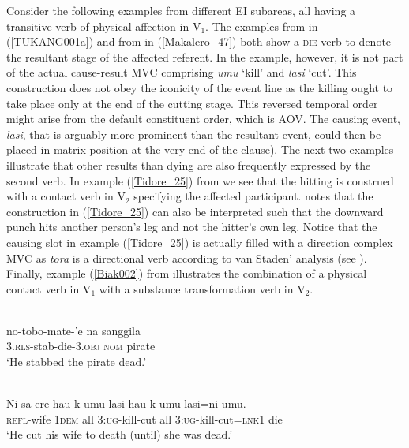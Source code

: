 Consider the following examples from different EI subareas, all having a transitive verb of physical affection in V$_1$. The examples from  in (\ref{TUKANG001a}) and from  in (\ref{Makalero_47}) both show a \textsc{die} verb to denote the resultant stage of the affected referent. In the  example, however, it is not part of the actual cause-result MVC comprising \textit{umu} `kill' and \textit{lasi} `cut'. This construction does not obey the iconicity of the event line as the killing ought to take place only at the end of the cutting stage. This reversed temporal order might arise from the default  constituent order, which is AOV. The causing event, \textit{lasi}, that is arguably more prominent than the resultant event, could then be placed in matrix position at the very end of the clause). The next two examples illustrate that other results than dying are also frequently expressed by the second verb. In example (\ref{Tidore_25}) from  we see that the hitting is construed with a contact verb in V$_2$ specifying the affected participant. \citet[126]{vanstaden2000tidore} notes that the construction in (\ref{Tidore_25}) can also be interpreted such that the downward punch hits another person's leg and not the hitter's own leg. Notice that the causing slot in example (\ref{Tidore_25}) is actually filled with a direction complex MVC as \textit{tora} is a directional verb according to van Staden' analysis (see \citealt[110]{vanstaden2000tidore}).  Finally, example (\ref{Biak002}) from  illustrates the combination of a physical contact verb in V$_1$ with a substance transformation verb in V$_2$.

\ea \label{TUKANG001a}
\\
\gll no-tobo-mate-'e na sanggila \\
\textsc{3}.\textsc{rls}-stab-die-\textsc{3}.\textsc{obj} \textsc{nom} pirate \\
\glft `He stabbed the pirate dead.'\\ 
\z

\ea \label{Makalero_47}
\\
\gll Ni-sa ere hau k-umu-lasi hau k-umu-lasi=ni umu. \\
\textsc{refl}-wife 1\textsc{dem} all 3:\textsc{ug}-kill-cut all 3:\textsc{ug}-kill-cut=\textsc{lnk}1 die \\
\glft `He cut his wife to death (until) she was dead.’\\ 
\z

